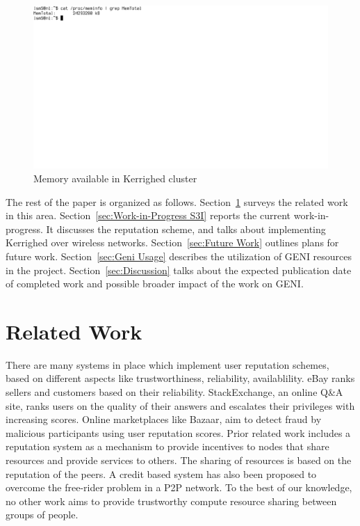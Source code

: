 \documentclass[10pt, conference, compsocconf]{IEEEtran}
\begin{document}
\begin{figure}[htbp]
 \centering
   \includegraphics[scale=0.28]{figures/kerrighed-memory}
\caption{Memory available in Kerrighed cluster}
\label{fig:kerrighed-memory}
\end{figure}

The rest of the paper is organized as follows. Section~\ref{sec:Related Work} surveys 
the related work in this area. Section~\ref{sec:Work-in-Progress S3I} reports the current
work-in-progress. It discusses the reputation scheme, and talks
about implementing Kerrighed over wireless networks. Section~\ref{sec:Future Work} outlines
plans for future work. Section~\ref{sec:Geni Usage} describes the utilization of
GENI resources in the project. Section~\ref{sec:Discussion} talks about the expected
publication date of completed work and possible broader impact of the work on GENI.


\section{Related Work}
\label{sec:Related Work}
There are many systems in place which implement user reputation schemes,
based on different aspects like trustworthiness, reliability,
availablility. eBay\cite{ebay} ranks sellers and
customers based on their reliability. StackExchange\cite{stackexchange},
an online Q\&A site, ranks users on the quality of their answers and escalates
their privileges with increasing scores. Online marketplaces like
Bazaar\cite{post}, aim to detect fraud by
malicious participants using user reputation scores. Prior related work
includes a reputation system as a mechanism to provide incentives
to nodes that share resources and provide services to others\cite{gupta}.
The sharing of resources is based on the reputation of the peers. A
credit based system has also been proposed to overcome the
free-rider problem in a P2P network\cite{zhong}.
To the best of our knowledge, no other work aims to provide
trustworthy compute resource sharing between groups of people.
\end{document}
